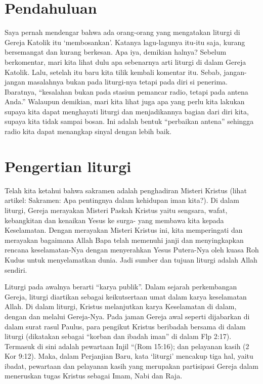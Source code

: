 
\section*{Pendahuluan}

Saya pernah mendengar bahwa ada orang-orang yang mengatakan liturgi di Gereja Katolik itu ‘membosankan’. Katanya lagu-lagunya itu-itu saja, kurang bersemangat dan kurang berkesan. Apa iya, demikian halnya? Sebelum berkomentar, mari kita lihat dulu apa sebenarnya arti liturgi di dalam Gereja Katolik. Lalu, setelah itu baru kita tilik kembali komentar itu. Sebab, jangan-jangan masalahnya bukan pada liturgi-nya tetapi pada diri si penerima. Ibaratnya, “kesalahan bukan pada stasiun pemancar radio, tetapi pada antena Anda.” Walaupun demikian, mari kita lihat juga apa yang perlu kita lakukan supaya kita dapat menghayati liturgi dan menjadikannya bagian dari diri kita, supaya kita tidak sampai bosan. Ini adalah bentuk “perbaikan antena” sehingga radio kita dapat menangkap sinyal dengan lebih baik.

\section*{Pengertian liturgi}

Telah kita ketahui bahwa sakramen adalah penghadiran Misteri Kristus (lihat artikel: Sakramen: Apa pentingnya dalam kehidupan iman kita?). Di dalam liturgi, Gereja merayakan Misteri Paskah Kristus yaitu sengsara, wafat, kebangkitan dan kenaikan Yesus ke surga- yang membawa kita kepada Keselamatan. Dengan merayakan Misteri Kristus ini, kita memperingati dan merayakan bagaimana Allah Bapa telah memenuhi janji dan menyingkapkan rencana keselamatan-Nya dengan menyerahkan Yesus Putera-Nya oleh kuasa Roh Kudus untuk menyelamatkan dunia. Jadi sumber dan tujuan liturgi adalah Allah sendiri.

Liturgi pada awalnya berarti “karya publik”. Dalam sejarah perkembangan Gereja, liturgi diartikan sebagai keikutsertaan umat dalam karya keselamatan Allah. Di dalam liturgi, Kristus melanjutkan karya Keselamatan di dalam, dengan dan melalui Gereja-Nya. Pada jaman Gereja awal seperti dijabarkan di dalam surat rasul Paulus, para pengikut Kristus beribadah bersama di dalam liturgi (dikatakan sebagai “korban dan ibadah iman” di dalam Flp 2:17). Termasuk di sini adalah pewartaan Injil “(Rom 15:16); dan pelayanan kasih (2 Kor 9:12). Maka, dalam Perjanjian Baru, kata ‘liturgi’ mencakup tiga hal, yaitu ibadat, pewartaan dan pelayanan kasih yang merupakan partisipasi Gereja dalam meneruskan tugas Kristus sebagai Imam, Nabi dan Raja.

